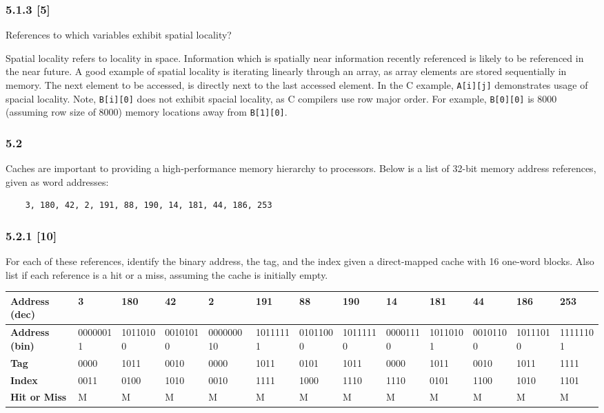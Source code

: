 \documentclass[fleqn]{article}
\begin{document}
\subsubsection*{5.1.3 [5] \textrangle} References to which variables exhibit spatial locality?
\begin{addmargin}[0.15cm]{0cm}
    Spatial locality refers to locality in space. Information which is spatially near information recently referenced is likely to be referenced in the near future. 
    A good example of spatial locality is iterating linearly through an array, as array elements are stored sequentially in memory. The next element to be accessed, is directly next to the last accessed element. In the C example, \verb|A[i][j]| demonstrates usage of spacial locality. 
    Note, \verb|B[i][0]| does not exhibit spacial locality, as C compilers use row major order. For example, \verb|B[0][0]| is $8000$ (assuming row size of $8000$) memory locations away from \verb|B[1][0]|.
\end{addmargin}

\subsubsection*{5.2} Caches are important to providing a high-performance memory hierarchy to processors. Below is a list of 32-bit memory address references, given as word addresses:
\begin{verbatim}
    3, 180, 42, 2, 191, 88, 190, 14, 181, 44, 186, 253
\end{verbatim}

\subsubsection*{5.2.1 [10] \textrangle} For each of these references, identify the binary address, the tag, and the index given a direct-mapped cache with 16 one-word blocks. Also list if each reference is a hit or a miss, assuming the cache is initially empty.
\begin{table}[H]
    \centering
    \setlength{\tabcolsep}{3pt}
    \fontsize{6pt}{12pt}\selectfont
    \begin{tabular}{l|l|l|l|l|l|l|l|l|l|l|l|l}
    \textbf{Address (dec)} & \textbf{3} & \textbf{180} & \textbf{42} & \textbf{2} & \textbf{191} & \textbf{88} & \textbf{190} & \textbf{14} & \textbf{181} & \textbf{44} & \textbf{186} & \textbf{253} \\ \hline
    \textbf{Address (bin)} & 00000011 & 10110100 & 00101010 & 000000010 & 10111111 & 01011000 & 10111110 & 00001110 & 10110101 & 00101100 & 10111010 & 11111101 \\ 
    \textbf{Tag} & 0000 & 1011 & 0010 & 0000 & 1011 & 0101 & 1011 & 0000 & 1011 & 0010 & 1011 & 1111 \\ 
    \textbf{Index} & 0011 & 0100 & 1010 & 0010 & 1111 & 1000 & 1110 & 1110 & 0101 & 1100 & 1010 & 1101 \\ 
    \textbf{Hit or Miss} & M & M & M & M & M & M & M & M & M & M & M & M \\ 
    \end{tabular}
\end{table}
\end{document}
